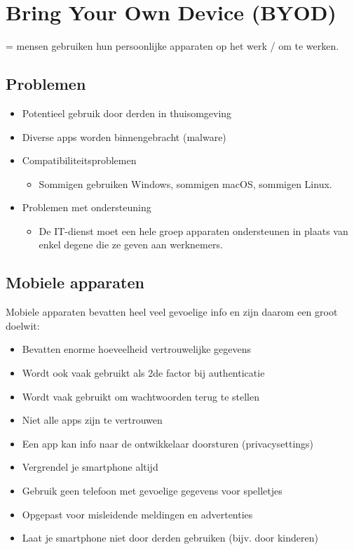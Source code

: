 \documentclass{article}
\begin{document}
\section{Bring Your Own Device (BYOD)}

= mensen gebruiken hun persoonlijke apparaten op het werk / om te werken.

\subsection{Problemen}

\begin{itemize}
    \item Potentieel gebruik door derden in thuisomgeving
    \item Diverse apps worden binnengebracht (malware)
    \item Compatibiliteitsproblemen
    \begin{itemize}
        \item Sommigen gebruiken Windows, sommigen macOS, sommigen Linux.
    \end{itemize}
    \item Problemen met ondersteuning
    \begin{itemize}
        \item De IT-dienst moet een hele groep apparaten ondersteunen in plaats van enkel degene die ze geven aan werknemers.
    \end{itemize}
\end{itemize}

\subsection{Mobiele apparaten}

Mobiele apparaten bevatten heel veel gevoelige info en zijn daarom een groot doelwit:

\begin{itemize}
    \item Bevatten enorme hoeveelheid vertrouwelijke gegevens
    \item Wordt ook vaak gebruikt als 2de factor bij authenticatie
    \item Wordt vaak gebruikt om wachtwoorden terug te stellen
    \item Niet alle apps zijn te vertrouwen
    \item Een app kan info naar de ontwikkelaar doorsturen (privacysettings)
    \item Vergrendel je smartphone altijd
    \item Gebruik geen telefoon met gevoelige gegevens voor spelletjes
    \item Opgepast voor misleidende meldingen en advertenties
    \item Laat je smartphone niet door derden gebruiken (bijv. door kinderen)
\end{itemize}
\end{document}
